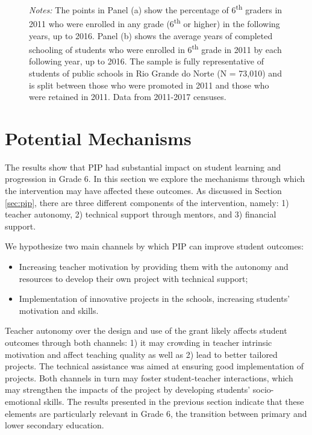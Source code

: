 \documentclass[11pt,a4paper]{article}
\begin{document}
\begin{figure}[ht!]
		\begin{minipage}{0.825\textwidth}
			\small{\textit{Notes:} The points in Panel (a) show the percentage of 6\textsuperscript{th} graders in 2011 who were enrolled in any grade (6\textsuperscript{th} or higher) in the following years, up to 2016. Panel (b) shows the average years of completed schooling of students who were enrolled in 6\textsuperscript{th} grade in 2011 by each following year, up to 2016. The sample is fully representative of students of public schools in Rio Grande do Norte (N = 73,010) and is split between those who were promoted in 2011 and those who were retained in 2011. Data from 2011-2017 censuses.}
		\end{minipage}
	\end{figure}
	
	\section{Potential Mechanisms} \label{sec:mechanism}
	
	The results show that PIP had substantial impact on student learning and progression in Grade 6. In this section we explore the mechanisms through which the intervention may have affected these outcomes. As discussed in Section \ref{sec:pip}, there are three different components of the intervention, namely: 1) teacher autonomy, 2) technical support through mentors, and 3) financial support.
	
	We hypothesize two main channels by which PIP can improve student outcomes: 
	\begin{itemize}
		\item Increasing teacher motivation by providing them with the autonomy and resources to develop their own project with technical support;
		\item Implementation of innovative projects in the schools, increasing students' motivation and skills.
	\end{itemize}
	
	Teacher autonomy over the design and use of the grant likely affects student outcomes through both channels: 1) it may crowding in teacher intrinsic motivation and affect teaching quality as well as 2) lead to better tailored projects. The technical assistance was aimed at ensuring good implementation of projects. Both channels in turn may foster student-teacher interactions, which may strengthen the impacts of the project by developing students' socio-emotional skills. The results presented in the previous section indicate that these elements are particularly relevant in Grade 6, the transition between primary and lower secondary education. 
	
\end{document}
